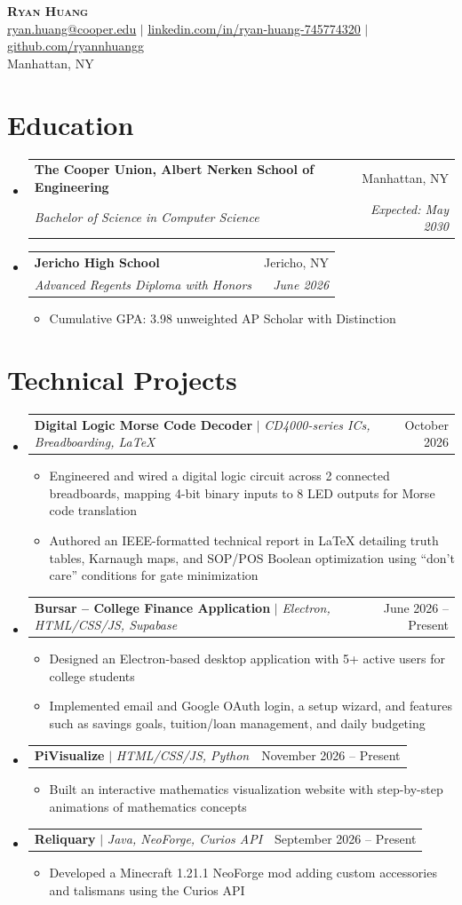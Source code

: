 \documentclass[letterpaper,11pt]{article}
\makeatletter
\newcommand{\resumeItem}[1]{
  \item\small{
    {#1 \vspace{-2pt}}
  }
}
\newcommand{\resumeSubheading}[4]{
  \vspace{-2pt}\item
    \begin{tabular*}{0.97\textwidth}[t]{l@{\extracolsep{\fill}}r}
      \textbf{#1} & #2 \\
      \textit{\small#3} & \textit{\small #4} \\
    \end{tabular*}\vspace{-7pt}
}
\newcommand{\resumeProjectHeading}[2]{
    \item
    \begin{tabular*}{0.97\textwidth}{l@{\extracolsep{\fill}}r}
      \small#1 & #2 \\
    \end{tabular*}\vspace{-7pt}
}
\newcommand{\resumeSubHeadingListStart}{\begin{itemize}[leftmargin=0.15in, label={}]}
\newcommand{\resumeSubHeadingListEnd}{\end{itemize}}
\newcommand{\resumeItemListStart}{\begin{itemize}}
\newcommand{\resumeItemListEnd}{\end{itemize}\vspace{-5pt}}
\makeatother
\begin{document}
\begin{center}
    \textbf{\Huge \scshape Ryan Huang} \\ \vspace{1pt}
    \href{mailto:ryan.huang@cooper.edu}{\underline{ryan.huang@cooper.edu}} $|$
    \href{https://linkedin.com/in/ryan-huang-745774320}{\underline{linkedin.com/in/ryan-huang-745774320}} $|$
    \href{https://github.com/ryannhuangg}{\underline{github.com/ryannhuangg}} \\
    Manhattan, NY
\end{center}

\section{Education}
  \resumeSubHeadingListStart
    \resumeSubheading
      {The Cooper Union, Albert Nerken School of Engineering}{Manhattan, NY}
      {Bachelor of Science in Computer Science}{Expected: May 2030}
    \resumeSubheading
      {Jericho High School}{Jericho, NY}
      {Advanced Regents Diploma with Honors}{June 2026}
      \resumeItemListStart
        \resumeItem{Cumulative GPA: 3.98 unweighted \textbar{} AP Scholar with Distinction}
      \resumeItemListEnd
  \resumeSubHeadingListEnd

\section{Technical Projects}
  \resumeSubHeadingListStart
    \resumeProjectHeading
      {\textbf{Digital Logic Morse Code Decoder} $|$ \emph{CD4000-series ICs, Breadboarding, LaTeX}}{October 2026}
      \resumeItemListStart
        \resumeItem{Engineered and wired a digital logic circuit across 2 connected breadboards, mapping 4-bit binary inputs to 8 LED outputs for Morse code translation}
        \resumeItem{Authored an IEEE-formatted technical report in LaTeX detailing truth tables, Karnaugh maps, and SOP/POS Boolean optimization using ``don't care'' conditions for gate minimization}
      \resumeItemListEnd
    \resumeProjectHeading
      {\textbf{Bursar -- College Finance Application} $|$ \emph{Electron, HTML/CSS/JS, Supabase}}{June 2026 -- Present}
      \resumeItemListStart
        \resumeItem{Designed an Electron-based desktop application with 5+ active users for college students}
        \resumeItem{Implemented email and Google OAuth login, a setup wizard, and features such as savings goals, tuition/loan management, and daily budgeting}
      \resumeItemListEnd
    \resumeProjectHeading
      {\textbf{PiVisualize} $|$ \emph{HTML/CSS/JS, Python}}{November 2026 -- Present}
      \resumeItemListStart
        \resumeItem{Built an interactive mathematics visualization website with step-by-step animations of mathematics concepts}
      \resumeItemListEnd
    \resumeProjectHeading
      {\textbf{Reliquary} $|$ \emph{Java, NeoForge, Curios API}}{September 2026 -- Present}
      \resumeItemListStart
        \resumeItem{Developed a Minecraft 1.21.1 NeoForge mod adding custom accessories and talismans using the Curios API}
      \resumeItemListEnd
  \resumeSubHeadingListEnd
\end{document}
